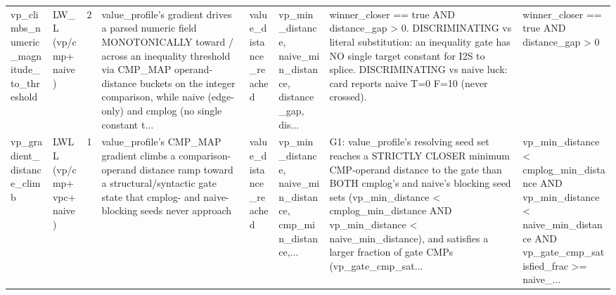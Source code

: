 \documentclass[7pt]{extarticle}
\begin{document}
{\begin{longtable}{@{}p{2.4cm}p{1.9cm}rp{4.3cm}p{1.5cm}p{1.7cm}p{4.6cm}p{3.0cm}@{}}
vp\_\allowbreak climbs\_\allowbreak numeric\_\allowbreak magnitude\_\allowbreak to\_\allowbreak threshold & LW\_\allowbreak L (vp/cmp+naive) & 2 & value\_\allowbreak profile's gradient drives a parsed numeric field MONOTONICALLY toward / across an inequality threshold via CMP\_\allowbreak MAP operand-distance buckets on the integer comparison, while naive (edge-only) and cmplog (no single constant t... & value\_\allowbreak distance\_\allowbreak reached & vp\_\allowbreak min\_\allowbreak distance, naive\_\allowbreak min\_\allowbreak distance, distance\_\allowbreak gap, dis... & winner\_\allowbreak closer == true AND distance\_\allowbreak gap \textgreater{} 0. DISCRIMINATING vs literal substitution: an inequality gate has NO single target constant for I2S to splice. DISCRIMINATING vs naive luck: card reports naive T=0 F=10 (never crossed). & winner\_\allowbreak closer == true AND distance\_\allowbreak gap \textgreater{} 0\\
vp\_\allowbreak gradient\_\allowbreak distance\_\allowbreak climb & LWLL (vp/cmp+vpc+naive) & 1 & value\_\allowbreak profile's CMP\_\allowbreak MAP gradient climbs a comparison-operand distance ramp toward a structural/syntactic gate state that cmplog- and naive-blocking seeds never approach & value\_\allowbreak distance\_\allowbreak reached & vp\_\allowbreak min\_\allowbreak distance, naive\_\allowbreak min\_\allowbreak distance, cmp\_\allowbreak min\_\allowbreak distance,... & G1: value\_\allowbreak profile's resolving seed set reaches a STRICTLY CLOSER minimum CMP-operand distance to the gate than BOTH cmplog's and naive's blocking seed sets (vp\_\allowbreak min\_\allowbreak distance \textless{} cmplog\_\allowbreak min\_\allowbreak distance AND vp\_\allowbreak min\_\allowbreak distance \textless{} naive\_\allowbreak min\_\allowbreak distance), and satisfies a larger fraction of gate CMPs (vp\_\allowbreak gate\_\allowbreak cmp\_\allowbreak sat... & vp\_\allowbreak min\_\allowbreak distance \textless{} cmplog\_\allowbreak min\_\allowbreak distance AND vp\_\allowbreak min\_\allowbreak distance \textless{} naive\_\allowbreak min\_\allowbreak distance AND vp\_\allowbreak gate\_\allowbreak cmp\_\allowbreak satisfied\_\allowbreak frac \textgreater{}= naive\_\allowbreak ...\\

\end{longtable}}
\end{document}
